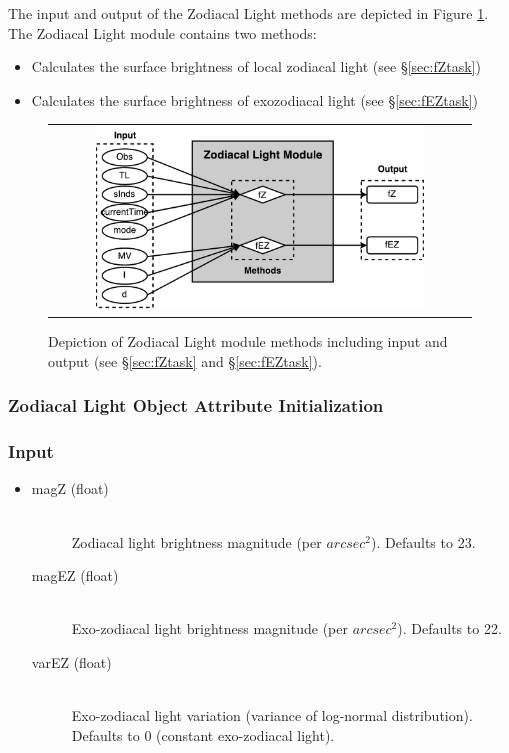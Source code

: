 \documentclass[cleanfoot]{asme2ej}
\newcommand{\reffig}[1]{Figure \ref{#1}}
\begin{document}
The input and output of the Zodiacal Light methods are depicted in \reffig{fig:zodiacallightmodule}. The Zodiacal Light module contains two methods:
\begin{itemize}[leftmargin=1in,font={\ttfamily}]
    \item[\texttt fZ] Calculates the surface brightness of local zodiacal light  (see \S\ref{sec:fZtask})
    \item[\texttt fEZ] Calculates the surface brightness of exozodiacal light (see \S\ref{sec:fEZtask})
\end{itemize}

\begin{figure}[ht]
    \begin{center}
        \begin{tabular}{c}
             \includegraphics[width=0.8\textwidth]{ZodiTasks2}
        \end{tabular}
    \end{center}
    \caption{\label{fig:zodiacallightmodule} Depiction of Zodiacal Light module methods including input and output (see \S\ref{sec:fZtask} and \S\ref{sec:fEZtask}).}
\end{figure}

\subsubsection{Zodiacal Light Object Attribute Initialization}

\subsubsection*{Input}
\begin{itemize}
\item
\begin{description}
    \item[magZ (float)] \hfill \\ Zodiacal light brightness magnitude (per $ arcsec^2 $). Defaults to 23.
    \item[magEZ (float)] \hfill \\ Exo-zodiacal light brightness magnitude (per $ arcsec^2 $). Defaults to 22.
    \item[varEZ (float)] \hfill \\ Exo-zodiacal light variation (variance of log-normal distribution). Defaults to 0 (constant exo-zodiacal light).
\end{description}
\end{itemize}
\end{document}
